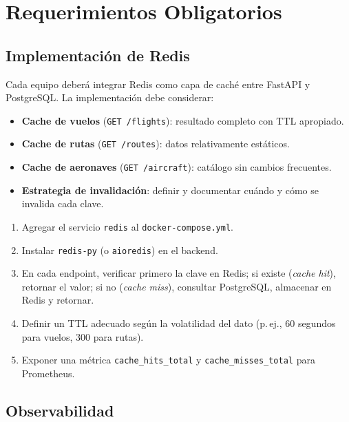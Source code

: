 \documentclass[12pt,a4paper]{article}
\begin{document}
\section{Requerimientos Obligatorios}

\subsection{Implementación de Redis}

Cada equipo deberá integrar Redis como capa de caché entre FastAPI y PostgreSQL. La implementación debe considerar:

\begin{itemize}
  \item \textbf{Cache de vuelos} (\texttt{GET /flights}): resultado completo con TTL apropiado.
  \item \textbf{Cache de rutas} (\texttt{GET /routes}): datos relativamente estáticos.
  \item \textbf{Cache de aeronaves} (\texttt{GET /aircraft}): catálogo sin cambios frecuentes.
  \item \textbf{Estrategia de invalidación}: definir y documentar cuándo y cómo se invalida cada clave.
\end{itemize}

\begin{infobox}
\begin{enumerate}
  \item Agregar el servicio \texttt{redis} al \texttt{docker-compose.yml}.
  \item Instalar \texttt{redis-py} (o \texttt{aioredis}) en el backend.
  \item En cada endpoint, verificar primero la clave en Redis; si existe (\textit{cache hit}), retornar el valor; si no (\textit{cache miss}), consultar PostgreSQL, almacenar en Redis y retornar.
  \item Definir un TTL adecuado según la volatilidad del dato (p.\,ej., 60 segundos para vuelos, 300 para rutas).
  \item Exponer una métrica \texttt{cache\_hits\_total} y \texttt{cache\_misses\_total} para Prometheus.
\end{enumerate}
\end{infobox}

\subsection{Observabilidad}
\end{document}
